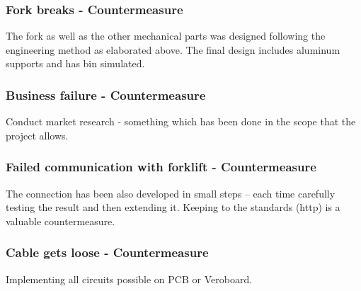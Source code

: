 \documentclass[../report.tex]{subfiles}
\begin{document}
\subsubsection{Fork breaks - Countermeasure}
The fork as well as the other mechanical parts was designed following the engineering method 
as elaborated above. The final design includes aluminum supports and has bin simulated. 
\subsubsection{Business failure - Countermeasure}
Conduct market research - something which has been done in the scope that the project allows.

\subsubsection{Failed communication with forklift - Countermeasure}
The connection has been also developed in small steps – each time carefully testing the result
 and then extending it. Keeping to the standards (http) is a valuable countermeasure. 
\subsubsection{Cable gets loose - Countermeasure}
Implementing all circuits possible on PCB or Veroboard.
\end{document}
